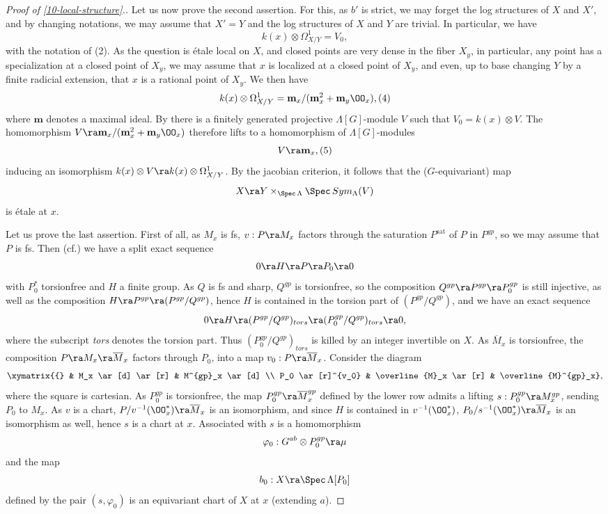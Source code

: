 \documentclass[10pt]{../fichiers-configuration-latex/smfart}
\begin{document}
\begin{proof}[Proof of \ref{10-local-structure}.]
Let us now prove the second assertion. For this, as $b'$ is strict, we may
forget the log structures of $X$ and $X'$, and by changing notations, we may
assume that $X' = Y$ and the log structures of $X$ and $Y$ are trivial. In
particular, we have $$ k(x) \otimes \Omega^1_{X/Y} = V_0, $$ with the notation
of (2). As the question is étale local on $X$, and closed points are very
dense in the fiber $X_y$, in particular, any point has a specialization at
a closed point of $X_y$, we may assume that $x$ is localized at a closed
point of $X_y$, and even, up to base changing $Y$ by a finite radicial
extension, that $x$ is a rational point of $X_y$. We then have $$ k(x) \otimes
\Omega^1_{X/Y} = \mathbf{m}_x/(\mathbf{m}_x^2 + \mathbf{m}_y\OO_x),
\leqno (4) $$ where $\mathbf{m}$ denotes a maximal ideal. By \cite[12 2.3,
13 14.4]{Representations@Serre} there is a finitely generated projective
$\Lambda[G]$-module $V$ such that $V_0 = k(x) \otimes V$. The homomorphism $V
\ra \mathbf{m}_x/(\mathbf{m}_x^2 + \mathbf{m}_y\OO_x)$ therefore lifts
to a homomorphism of $\Lambda[G]$-modules $$ V \ra \mathbf{m}_x, \leqno (5) $$
inducing an isomorphism $k(x) \otimes V \ra k(x) \otimes \Omega^1_{X/Y}$. By
the jacobian criterion, it follows that the ($G$-equivariant) map $$ X \ra
Y \times_{\Spec \, \Lambda} \Spec \, Sym_{\Lambda}(V) $$ is étale at $x$.

Let us prove the last assertion. First of all, as $M_x$ is fs, $v : P \ra
M_x$ factors through the saturation $P^{\mathrm{sat}}$ of $P$ in $P^{gp}$,
so we may assume that $P$ is fs. Then (cf.\cite[5.3.42]{HT@GR}) we have
a split exact sequence $$ 0 \ra H \ra P \ra P_0 \ra 0 $$ with $P_0^*$
torsionfree and $H$ a finite group. As $Q$ is fs and sharp, $Q^{gp}$ is
torsionfree, so the composition $Q^{gp} \ra P^{gp} \ra P_0^{gp}$ is still
injective, as well as the composition $H \ra P^{gp} \ra (P^{gp}/Q^{gp})$,
hence $H$ is contained in the torsion part of $(P^{gp}/Q^{gp})$, and
we have an exact sequence $$ 0 \ra H \ra (P^{gp}/Q^{gp})_{tors} \ra
(P_0^{gp}/Q^{gp})_{tors} \ra 0, $$ where the subscript \textit{tors} denotes
the torsion part. Thus $(P_0^{gp}/Q^{gp})_{tors}$ is killed by an integer
invertible on $X$. As $\overline{M}_x$ is torsionfree, the composition
$P \ra M_x \ra \overline{M}_x$ factors through $P_0$, into a map $v_0 :
P \ra \overline{M}_x$. Consider the diagram $$ \xymatrix{{} & M_x \ar[d]
\ar[r] & M^{gp}_x \ar[d] \\ P_0 \ar[r]^{v_0} & \overline{M}_x \ar[r] &
\overline{M}^{gp}_x}, $$ where the square is cartesian. As $P_0^{gp}$
is torsionfree, the map $P^{gp}_0 \ra \overline{M}^{gp}_x$ defined by the
lower row admits a lifting $s : P_0^{gp} \ra M^{gp}_x$, sending $P_0$ to
$M_x$. As $v$ is a chart, $P/v^{-1}(\OO_x^*)  \ra \overline{M}_x$
is an isomorphism, and since $H$ is contained in $v^{-1}(\OO_x^*)$,
$P_0/s^{-1}(\OO_x^*) \ra \overline{M}_x$ is an isomorphism as well,
hence $s$ is a chart at $x$. Associated with $s$ is a homomorphism $$
\varphi_0 : G^{ab} \otimes P_0^{gp} \ra \mu $$ and the map $$ b_0 : X \ra
\Spec \, \Lambda[P_0] $$ defined by the pair $(s,\varphi_0)$ is an equivariant
chart of $X$ at $x$ (extending $a$).
\end{proof}
\end{document}
